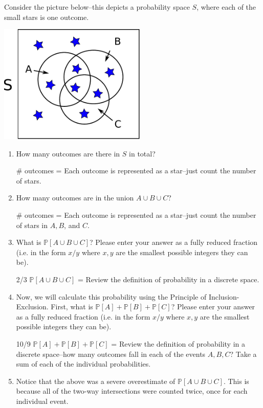\documentclass[11pt, preview]{standalone} %
\newcommand{\Prob}{\mathbb{P}}
\begin{document}
\begin{enumerate}
Consider the picture below--this depicts a probability space $S$, where each of the small stars is one outcome. 
\begin{center}
\includegraphics[width=7cm]{inclexcl.pdf}
\end{center}
\begin{enumerate}
\item How many outcomes are there in $S$ in total?
\begin{Freeform}{9}
\# outcomes = 
\Hint Each outcome is represented as a star--just count the number of stars.
\end{Freeform}
\item How many outcomes are in the union $A \cup B \cup C$?
\begin{Freeform}{6}
\# outcomes = 
\Hint Each outcome is represented as a star--just count the number of stars in $A,B$, and $C$.
\end{Freeform}
\item What is $\Prob[A \cup B \cup C]$? Please enter your answer as a fully reduced fraction (i.e. in the form $x/y$ where $x,y$ are the smallest possible integers they can be).
\begin{Freeform}{2/3}
$\Prob[A \cup B \cup C]$ = 
\Hint Review the definition of probability in a discrete space.
\end{Freeform}
\item Now, we will calculate this probability using the Principle of Inclusion-Exclusion. First, what is $ \Prob[A] + \Prob[B] + \Prob[C]$? Please enter your answer as a fully reduced fraction (i.e. in the form $x/y$ where $x,y$ are the smallest possible integers they can be).
\begin{Freeform}{10/9}
$ \Prob[A] + \Prob[B] + \Prob[C]$ = 
\Hint Review the definition of probability in a discrete space--how many outcomes fall in each of the events $A, B, C$? Take a sum of each of the individual probabilities.
\end{Freeform}
\item Notice that the above was a severe overestimate of $\Prob[A \cup B \cup C]$. This is because all of the two-way intersections were counted twice, once for each individual event. 


\end{enumerate}
\end{enumerate}
\end{document}
